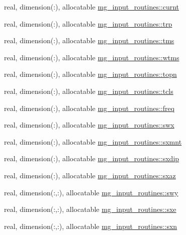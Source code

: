 \begin{DoxyCompactItemize}
\item 
real, dimension(\+:), allocatable \hyperlink{namespacemg__input__routines_ad16e03a98826653c76c46073ce55bf5c}{mg\+\_\+input\+\_\+routines\+::curnt}
\item 
real, dimension(\+:), allocatable \hyperlink{namespacemg__input__routines_aad565f885af40eb427c94718418eacd0}{mg\+\_\+input\+\_\+routines\+::trp}
\item 
real, dimension(\+:), allocatable \hyperlink{namespacemg__input__routines_a23536c19317019a59a4edd6d333473c8}{mg\+\_\+input\+\_\+routines\+::tms}
\item 
real, dimension(\+:), allocatable \hyperlink{namespacemg__input__routines_acdcf9d9c5c6aa5caa0717ba290f56d75}{mg\+\_\+input\+\_\+routines\+::wtms}
\item 
real, dimension(\+:), allocatable \hyperlink{namespacemg__input__routines_a3573ee6dda5d312d3825a8a676b907b8}{mg\+\_\+input\+\_\+routines\+::topn}
\item 
real, dimension(\+:), allocatable \hyperlink{namespacemg__input__routines_ae17a0b5618d3599e2ef58e1f2227ab68}{mg\+\_\+input\+\_\+routines\+::tcls}
\item 
real, dimension(\+:), allocatable \hyperlink{namespacemg__input__routines_aed0c04ce17d1cbf624d2544819459544}{mg\+\_\+input\+\_\+routines\+::freq}
\item 
real, dimension(\+:), allocatable \hyperlink{namespacemg__input__routines_a2ec39304a790c075267ce8d0a9df5198}{mg\+\_\+input\+\_\+routines\+::swx}
\item 
real, dimension(\+:), allocatable \hyperlink{namespacemg__input__routines_ad077d55e4c73022ff46aa22100c32219}{mg\+\_\+input\+\_\+routines\+::sxmnt}
\item 
real, dimension(\+:), allocatable \hyperlink{namespacemg__input__routines_abb059525b2cbc04fed2e250e0ed7df08}{mg\+\_\+input\+\_\+routines\+::sxdip}
\item 
real, dimension(\+:), allocatable \hyperlink{namespacemg__input__routines_aa821bce738fe1604b19b8d83db934692}{mg\+\_\+input\+\_\+routines\+::sxaz}
\item 
real, dimension(\+:,\+:), allocatable \hyperlink{namespacemg__input__routines_a918ef23c1105dc44a79428e83be090c8}{mg\+\_\+input\+\_\+routines\+::swy}
\item 
real, dimension(\+:,\+:), allocatable \hyperlink{namespacemg__input__routines_af04dae3936f15389226f46ddc8c0f815}{mg\+\_\+input\+\_\+routines\+::sxe}
\item 
real, dimension(\+:,\+:), allocatable \hyperlink{namespacemg__input__routines_a767f35aedf1b84295f2130e0d4028b97}{mg\+\_\+input\+\_\+routines\+::sxn}

\end{DoxyCompactItemize}
